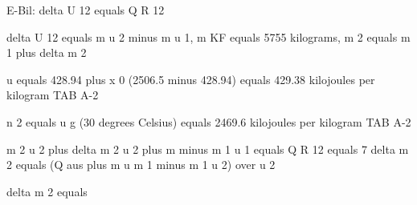 E-Bil: delta U 12 equals Q R 12

delta U 12 equals m u 2 minus m u 1, m KF equals 5755 kilograms, m 2 equals m 1 plus delta m 2

u equals 428.94 plus x 0 (2506.5 minus 428.94) equals 429.38 kilojoules per kilogram TAB A-2

n 2 equals u g (30 degrees Celsius) equals 2469.6 kilojoules per kilogram TAB A-2

m 2 u 2 plus delta m 2 u 2 plus m minus m 1 u 1 equals Q R 12 equals 7 delta m 2 equals (Q aus plus m u m 1 minus m 1 u 2) over u 2

delta m 2 equals